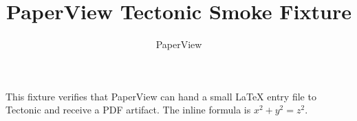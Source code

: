 \documentclass{article}
\title{PaperView Tectonic Smoke Fixture}
\author{PaperView}
\date{}
\begin{document}
\maketitle

This fixture verifies that PaperView can hand a small LaTeX entry file to
Tectonic and receive a PDF artifact. The inline formula is $x^2 + y^2 = z^2$.
\end{document}
